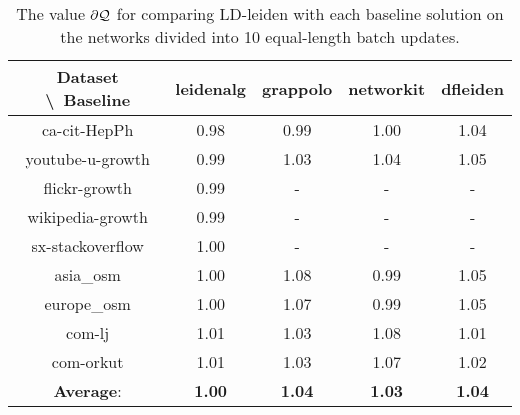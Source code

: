 \begin{table}[H]
	\centering
	\begin{tabular}{|c|c|c|c|c|}
		\hline
		Dataset \textbackslash\ Baseline & leidenalg & grappolo & networkit & dfleiden \\
		\hline
		ca-cit-HepPh & 0.98 & 0.99 & 1.00 & 1.04 \\
		\hline
		youtube-u-growth & 0.99 & 1.03 & 1.04 & 1.05 \\
		\hline
		flickr-growth & 0.99 & - & - & - \\
		\hline
		wikipedia-growth & 0.99 & - & - & - \\
		\hline
		sx-stackoverflow & 1.00 & - & - & - \\
		\hline
		asia\_osm & 1.00 & 1.08 & 0.99 & 1.05 \\
		\hline
		europe\_osm & 1.00 & 1.07 & 0.99 & 1.05 \\
		\hline
		com-lj & 1.01 & 1.03 & 1.08 & 1.01 \\
		\hline
		com-orkut & 1.01 & 1.03 & 1.07 & 1.02 \\
		\hline
		\textbf{Average}: & \textbf{1.00} & \textbf{1.04} & \textbf{1.03} & \textbf{1.04} \\
		\hline
	\end{tabular}
\caption{The value $\partial\mathcal{Q}$ for comparing LD-leiden with each baseline solution on the networks divided into 10 equal-length batch updates.}
\label{T:lastM:10 batches}
\end{table}